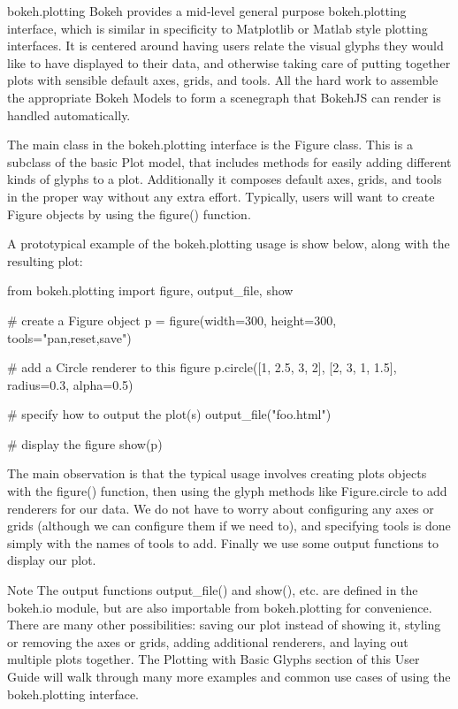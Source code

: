 bokeh.plotting
Bokeh provides a mid-level general purpose bokeh.plotting interface, which is similar in specificity to Matplotlib or Matlab style plotting interfaces. It is centered around having users relate the visual glyphs they would like to have displayed to their data, and otherwise taking care of putting together plots with sensible default axes, grids, and tools. All the hard work to assemble the appropriate Bokeh Models to form a scenegraph that BokehJS can render is handled automatically.

The main class in the bokeh.plotting interface is the Figure class. This is a subclass of the basic Plot model, that includes methods for easily adding different kinds of glyphs to a plot. Additionally it composes default axes, grids, and tools in the proper way without any extra effort. Typically, users will want to create Figure objects by using the figure() function.

A prototypical example of the bokeh.plotting usage is show below, along with the resulting plot:

from bokeh.plotting import figure, output_file, show

# create a Figure object
p = figure(width=300, height=300, tools="pan,reset,save")

# add a Circle renderer to this figure
p.circle([1, 2.5, 3, 2], [2, 3, 1, 1.5], radius=0.3, alpha=0.5)

# specify how to output the plot(s)
output_file("foo.html")

# display the figure
show(p)
	
The main observation is that the typical usage involves creating plots objects with the figure() function, then using the glyph methods like Figure.circle to add renderers for our data. We do not have to worry about configuring any axes or grids (although we can configure them if we need to), and specifying tools is done simply with the names of tools to add. Finally we use some output functions to display our plot.

Note
The output functions output_file() and show(), etc. are defined in the bokeh.io module, but are also importable from bokeh.plotting for convenience.
There are many other possibilities: saving our plot instead of showing it, styling or removing the axes or grids, adding additional renderers, and laying out multiple plots together. The Plotting with Basic Glyphs section of this User Guide will walk through many more examples and common use cases of using the bokeh.plotting interface.

